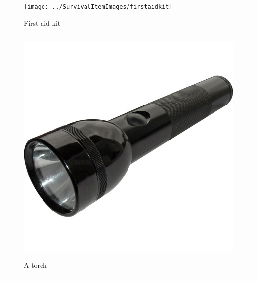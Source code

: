 \documentclass{article}
\begin{document}
    \begin{figure}[H]
        \centering
        \begin{minipage}{0.25\textwidth}
            \centering
            \texttt{[image: ../SurvivalItemImages/firstaidkit]}
        \end{minipage}\hfill
        \begin{minipage}{0.7\textwidth}
            \centering
            \Large First aid kit
        \end{minipage}
    \end{figure}
    \vspace{-0.8em}
    \noindent\rule{\textwidth}{0.4pt}
            
    \begin{figure}[H]
        \centering
        \begin{minipage}{0.25\textwidth}
            \centering
            \includegraphics[width=\textwidth]{../SurvivalItemImages/torch}
        \end{minipage}\hfill
        \begin{minipage}{0.7\textwidth}
            \centering
            \Large A torch
        \end{minipage}
    \end{figure}
    \vspace{-0.8em}
    \noindent\rule{\textwidth}{0.4pt}
            
\end{document}
